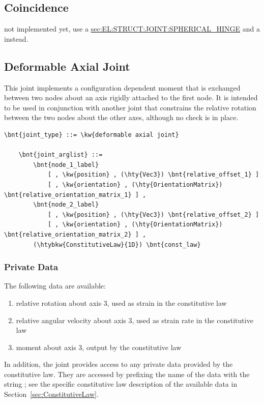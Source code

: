 \subsection{Coincidence}
not implemented yet, use a
\hyperref{\kw{spherical hinge}}{\kw{spherical hinge} (see Section~}{)}{sec:EL:STRUCT:JOINT:SPHERICAL_HINGE}
and a  
instead.




\subsection{Deformable Axial Joint}
\label{sec:EL:JOINT:DEFORMABLEAXIAL}
This joint implements a configuration dependent moment that is exchanged
between two nodes about an axis rigidly attached to the first node.
It is intended to be used in conjunction with another joint that
constrains the relative rotation between the two nodes about the other axes,
although no check is in place.
\begin{Verbatim}[commandchars=\\\{\}]
    \bnt{joint_type} ::= \kw{deformable axial joint}

    \bnt{joint_arglist} ::= 
        \bnt{node_1_label}
            [ , \kw{position} , (\hty{Vec3}) \bnt{relative_offset_1} ]
            [ , \kw{orientation} , (\hty{OrientationMatrix}) \bnt{relative_orientation_matrix_1} ] ,
        \bnt{node_2_label}
            [ , \kw{position} , (\hty{Vec3}) \bnt{relative_offset_2} ]
            [ , \kw{orientation} , (\hty{OrientationMatrix}) \bnt{relative_orientation_matrix_2} ] ,
        (\htybkw{ConstitutiveLaw}{1D}) \bnt{const_law}
\end{Verbatim}

\subsubsection{Private Data}
The following data are available:
\begin{enumerate}
\item {} relative rotation about axis 3, used as strain in the constitutive law
\item {} relative angular velocity about axis 3, used as strain rate in the constitutive law
\item {} moment about axis 3, output by the constitutive law
\end{enumerate}
In addition, the joint provides
access to any private data provided by the constitutive law.
They are accessed by prefixing the name of the data with the string
; see the specific constitutive law
description of the available data in Section~\ref{sec:ConstitutiveLaw}.


